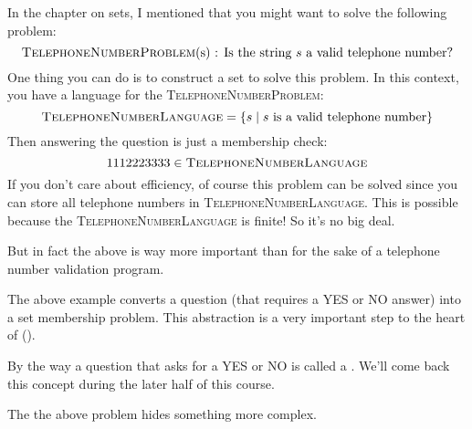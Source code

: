 In the chapter on sets, I mentioned that
you might want to solve the following problem:
\[
\text{\textsc{TelephoneNumberProblem}(s) : Is the string $s$ a valid telephone number?}
\]
One thing you can do is to construct a set
to solve this problem.
In this context, you have a language for the
\textsc{TelephoneNumberProblem}:
\[
\textsc{TelephoneNumberLanguage} = \{s \mid s \text{ is a valid telephone number}\}
\]
Then answering
the question
 is just a  membership check:
\[
1112223333 \in \textsc{TelephoneNumberLanguage}
\]
If you don't care about efficiency,
of course this problem can be solved since you
can store all telephone numbers in 
\textsc{TelephoneNumberLanguage}.
This is possible because the
\textsc{TelephoneNumberLanguage}
is finite!
So it's no big deal.

But in fact the above is way more important than for the sake of
a telephone number validation program.

The above example converts a question (that requires a YES or NO answer)
into a set membership problem.
This abstraction is a very important step
to the heart of
\sidebarskip{12pt}
(\sidebarskip{0pt}).

By the way a question that asks for a YES or NO
is called a .
We'll come back this concept during the later half of this course.

The the above problem hides something more complex.
  
